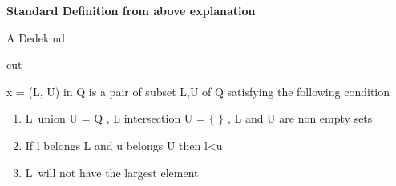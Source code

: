 \documentclass[12pt]{article}
\renewcommand{\_}{\kern-1.5pt\textunderscore\kern-1.5pt}
\begin{document}
\vspace{\baselineskip}

\vspace{\baselineskip}

\vspace{\baselineskip}

\vspace{\baselineskip}

\vspace{\baselineskip}

\vspace{\baselineskip}

\vspace{\baselineskip}
\begin{FlushLeft}
{\fontsize{14pt}{16.8pt}\selectfont \textbf{Standard Definition from above explanation}\par}
\end{FlushLeft}\par


\vspace{\baselineskip}
{\fontsize{11pt}{13.2pt}\selectfont \textcolor[HTML]{161616}{A Dedekind }{\fontsize{14pt}{16.8pt}\selectfont \textcolor[HTML]{161616}{cut }{\fontsize{13pt}{15.6pt}\selectfont \textcolor[HTML]{161616}{x = (L, U)\textit{ }in Q is a pair of subset L,U of Q satisfying the following condition}\par}\par}\par}\par


\vspace{\baselineskip}
\begin{enumerate}
	\item {\fontsize{13pt}{15.6pt}\selectfont \textcolor[HTML]{161616}{L\ union U = Q ,  L intersection U = $ \{ $ $ \} $ , L and U are non empty sets}\par}\par

	\item {\fontsize{13pt}{15.6pt}\selectfont \textcolor[HTML]{161616}{If l belongs L and u belongs U then l<u}\par}\par

	\item {\fontsize{13pt}{15.6pt}\selectfont \textcolor[HTML]{161616}{L\ will not have the largest element  }\par}
\end{enumerate}\par
\end{document}
